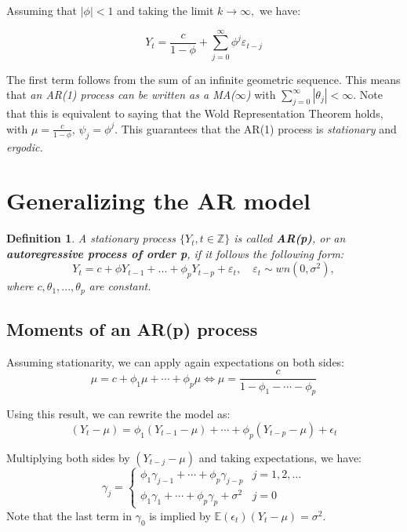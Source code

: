 \documentclass[11pt, a4paper]{report}
\theoremstyle{plain}
\theoremstyle{plain}
\newtheorem{defn}{Definition}[section]
\theoremstyle{remark}
\begin{document}
Assuming that $|\phi|<1$ and taking the limit $k \rightarrow \infty,$ we have:

$$
Y_{t}=\frac{c}{1-\phi}+\sum_{j=0}^{\infty} \phi^{j} \varepsilon_{t-j}
$$

The first term follows from the sum of an infinite geometric sequence. This means that \textit{an AR(1) process can be written as a MA($\infty$)} with $\sum_{j = 0}^\infty | \theta_j | < \infty$. Note that this is equivalent to saying that the Wold Representation Theorem holds, with $\mu = \frac{c}{1 - \phi}$, $\psi_j = \phi^j$. This guarantees that the AR(1) process is \textit{stationary} and \textit{ergodic.}

\section{Generalizing the AR model}

\begin{defn}
	A stationary process $\{Y_t, t \in \mathbb{Z} \}$ is called \textbf{AR(p)}, or an \textbf{autoregressive process of order p}, if it follows the following form:
	$$ Y_t = c + \phi Y_{t-1} + ... + \phi_p Y_{t-p} + \varepsilon_t, \hspace{1em} \varepsilon_t \sim wn(0, \sigma^2), $$
	where $c, \theta_1, ..., \theta_p$ are constant.
\end{defn}

\subsection{Moments of an AR(p) process}

Assuming stationarity, we can apply again expectations on both sides:
$$
\mu=c+\phi_{1} \mu+\cdots+\phi_{p} \mu \Longleftrightarrow \mu=\frac{c}{1-\phi_{1}-\cdots-\phi_{p}}
$$

Using this result, we can rewrite the model as:
$$
\left(Y_{t}-\mu\right)=\phi_{1}\left(Y_{t-1}-\mu\right)+\cdots+\phi_{p}\left(Y_{t-p}-\mu\right)+\epsilon_{t}
$$

Multiplying both sides by $\left(Y_{t-j}-\mu\right)$ and taking expectations, we have:
$$
\gamma_{j}=\left\{\begin{array}{ll}
	\phi_{1} \gamma_{j-1}+\cdots+\phi_{p} \gamma_{j-p} & j=1,2, \ldots \\
	\phi_{1} \gamma_{1}+\cdots+\phi_{p} \gamma_{p}+\sigma^{2} & j=0
\end{array}\right.
$$
Note that the last term in $\gamma_{0}$ is implied by $\mathbb{E}\left(\epsilon_{t}\right)\left(Y_{t}-\mu\right)=\sigma^{2}$.
\end{document}
